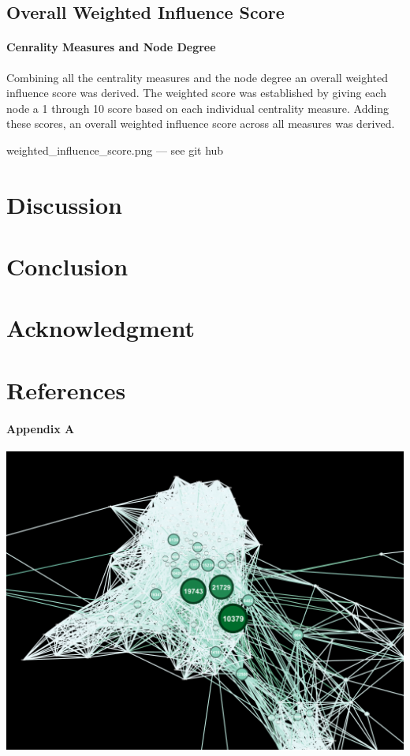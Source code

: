 \documentclass[11pt,twocolumn]{article}
\begin{document}
\subsection{ Overall Weighted Influence Score}

\paragraph{Cenrality Measures and Node Degree}
Combining all the centrality measures and the node degree an overall weighted influence score was derived. The weighted score was established by giving each node a 1 through 10 score based on each individual centrality measure. Adding these scores, an overall weighted influence score across all measures was derived.

weighted_influence_score.png --- see git hub

\section{Discussion}


\section{Conclusion}


\section{Acknowledgment}
\section{References}
 



\appendixpage
\paragraph{Appendix A\newline\newline}
\includegraphics[scale=0.22]{betweennesscentraility_gov.png}
\end{document}
